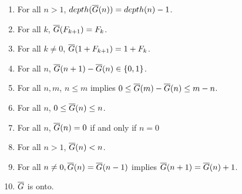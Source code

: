 \documentclass[a4paper,11pt]{article}
\begin{document}
\begin{theorem}\label{FGprops}
\noindent
\begin{enumerate}
\item For all $n>1$, $depth(\overline{G}(n)) = depth(n)-1$.
\item For all $k$, $\overline{G}(F_{k+1}) = F_k$.
\item For all $k\neq 0$, $\overline{G}(1+F_{k+1}) = 1+F_k$.
\item For all $n$, $\overline{G}(n+1)-\overline{G}(n) \in \{0,1\}$.
\item For all $n,m$, $n\le m$ implies $0 \le \overline{G}(m)-\overline{G}(n) \le m-n$.
\item For all $n$, $0 \le \overline{G}(n) \le n$.
\item For all $n$, $\overline{G}(n)=0$ if and only if $n=0$
\item For all $n>1$, $\overline{G}(n)<n$.
\item For all $n\neq 0, \overline{G}(n)=\overline{G}(n-1)$ implies $\overline{G}(n+1)=\overline{G}(n)+1$.
\item $\overline{G}$ is onto.
\end{enumerate}
\end{theorem}
\end{document}
